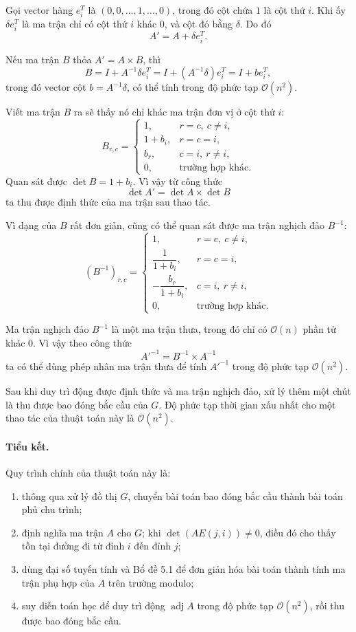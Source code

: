 \documentclass[11pt]{article}
\newcommand{\Oh}{\mathcal{O}}
\begin{document}
Gọi vector hàng \(e_i^T\) là \((0,0,\ldots,1,\ldots,0)\), trong đó cột chứa
\(1\) là cột thứ \(i\). Khi ấy \(\delta e_i^T\) là ma trận chỉ có cột thứ
\(i\) khác \(0\), và cột đó bằng \(\delta\). Do đó
\[
  A'=A+\delta e_i^T.
\]

Nếu ma trận \(B\) thỏa \(A'=A\times B\), thì
\[
  B=I+A^{-1}\delta e_i^T=I+(A^{-1}\delta)e_i^T=I+be_i^T,
\]
trong đó vector cột \(b=A^{-1}\delta\), có thể tính trong độ phức tạp
\(\Oh(n^2)\).

Viết ma trận \(B\) ra sẽ thấy nó chỉ khác ma trận đơn vị ở cột thứ \(i\):
\[
  B_{r,c}=
  \begin{cases}
    1, & r=c,\ c\ne i,\\
    1+b_i, & r=c=i,\\
    b_r, & c=i,\ r\ne i,\\
    0, & \text{trường hợp khác}.
  \end{cases}
\]
Quan sát được \(\det B=1+b_i\). Vì vậy từ công thức
\[
  \det A'=\det A\times\det B
\]
ta thu được định thức của ma trận sau thao tác.

Vì dạng của \(B\) rất đơn giản, cũng có thể quan sát được ma trận nghịch đảo
\(B^{-1}\):
\[
  (B^{-1})_{r,c}=
  \begin{cases}
    1, & r=c,\ c\ne i,\\
    \dfrac{1}{1+b_i}, & r=c=i,\\
    -\dfrac{b_r}{1+b_i}, & c=i,\ r\ne i,\\
    0, & \text{trường hợp khác}.
  \end{cases}
\]

Ma trận nghịch đảo \(B^{-1}\) là một ma trận thưa, trong đó chỉ có \(\Oh(n)\)
phần tử khác \(0\). Vì vậy theo công thức
\[
  A'^{-1}=B^{-1}\times A^{-1}
\]
ta có thể dùng phép nhân ma trận thưa để tính \(A'^{-1}\) trong độ phức tạp
\(\Oh(n^2)\).

Sau khi duy trì động được định thức và ma trận nghịch đảo, xử lý thêm một
chút là thu được bao đóng bắc cầu của \(G\). Độ phức tạp thời gian xấu nhất
cho một thao tác của thuật toán này là \(\Oh(n^2)\).

\paragraph{Tiểu kết.}
Quy trình chính của thuật toán này là:
\begin{enumerate}
  \item thông qua xử lý đồ thị \(G\), chuyển bài toán bao đóng bắc cầu thành
  bài toán phủ chu trình;

  \item định nghĩa ma trận \(A\) cho \(G\); khi \(\det(AE(j,i))\ne 0\), điều
  đó cho thấy tồn tại đường đi từ đỉnh \(i\) đến đỉnh \(j\);

  \item dùng đại số tuyến tính và Bổ đề 5.1 để đơn giản hóa bài toán thành
  tính ma trận phụ hợp của \(A\) trên trường modulo;

  \item suy diễn toán học để duy trì động \(\operatorname{adj} A\) trong độ
  phức tạp \(\Oh(n^2)\), rồi thu được bao đóng bắc cầu.
\end{enumerate}
\end{document}
